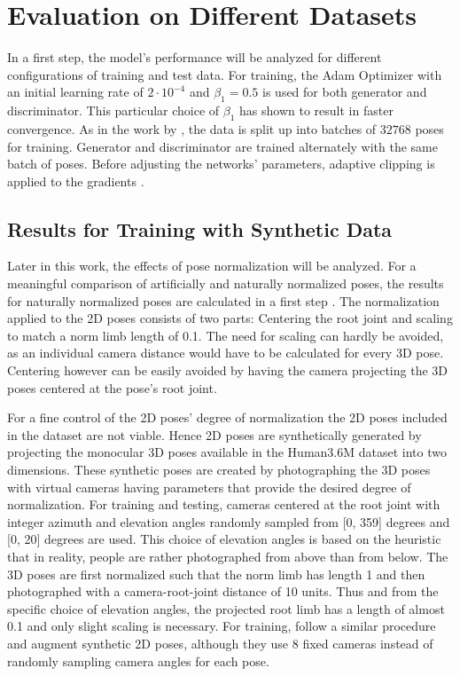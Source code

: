 \section{
	Evaluation on Different Datasets}
\label{sec:evaluation}

In a first step, the model's performance will be analyzed for different configurations of training and test data.
For training, the Adam Optimizer \cite{kingma17} with an initial learning rate of $2 \cdot 10^{-4}$ and $\beta_1 = 0.5$ is used for both generator and discriminator.
This particular choice of $\beta_1$ has shown to result in faster convergence.
As in the work by \citet{drover18}, the data is split up into batches of $32768$ poses for training.
Generator and discriminator are trained alternately with the same batch of poses.
Before adjusting the networks' parameters, adaptive clipping is applied to the gradients \cite[Section~3.2.1]{chorowski14}.


\subsection{Results for Training with Synthetic Data}

Later in this work, the effects of pose normalization will be analyzed.
For a meaningful comparison of artificially and naturally normalized poses, the results for naturally normalized poses are calculated in a first step .
The normalization applied to the 2D poses consists of two parts: Centering the root joint and scaling to match a norm limb length of 0.1.
The need for scaling can hardly be avoided, as an individual camera distance would have to be calculated for every 3D pose.
Centering however can be easily avoided by having the camera projecting the 3D poses centered at the pose's root joint.

For a fine control of the 2D poses' degree of normalization the 2D poses included in the dataset are not viable.
Hence 2D poses are synthetically generated by projecting the monocular 3D poses available in the Human3.6M dataset into two dimensions.
These synthetic poses are created by photographing the 3D poses with virtual cameras having parameters that provide the desired degree of normalization.
For training and testing, cameras centered at the root joint with integer azimuth and elevation angles randomly sampled from [0, 359] degrees and [0, 20] degrees are used.
This choice of elevation angles is based on the heuristic that in reality, people are rather photographed from above than from below.
The 3D poses are first normalized such that the norm limb has length 1 and then photographed with a camera-root-joint distance of 10 units.
Thus and from the specific choice of elevation angles, the projected root limb has a length of almost 0.1 and only slight scaling is necessary.
For training, \citet{drover18} follow a similar procedure and augment synthetic 2D poses, although they use 8 fixed cameras instead of randomly sampling camera angles for each pose.

